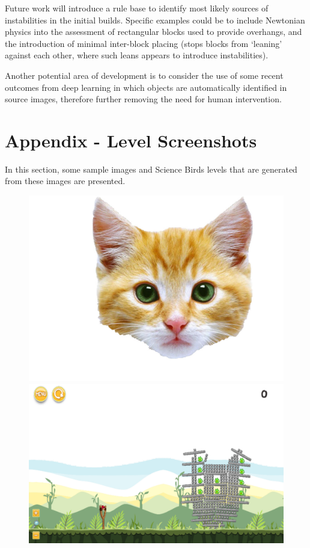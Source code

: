\documentclass{dalthesis}
\begin{document}
Future work will introduce a rule base to identify most likely sources of instabilities in the initial builds. Specific examples could be to include Newtonian physics into the assessment of rectangular blocks used to provide overhangs, and the introduction of minimal inter-block placing (stops blocks from `leaning' against each other, where such leans appears to introduce instabilities).

Another potential area of development is to consider the use of some recent outcomes from deep learning in which objects are automatically identified in source images, therefore further removing the need for human intervention.
\appendix
\chapter{Appendix - Level Screenshots}\label{sec:appendix}

In this section, some sample images and Science Birds levels that are generated from these images are presented.

\begin{figure}
  \includegraphics[width=\textwidth,height=\textheight,keepaspectratio]{levels/pictures/animals/cat.jpg}
  \includegraphics[width=\textwidth,height=\textheight,keepaspectratio]{levels/screenshots/animals/cat.png}
\end{figure}
\end{document}
